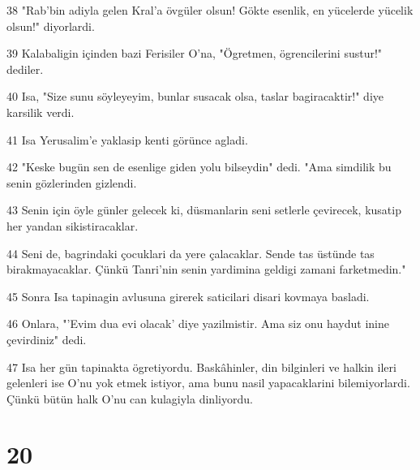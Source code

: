 \par 38 "Rab'bin adiyla gelen Kral'a övgüler olsun! Gökte esenlik, en yücelerde yücelik olsun!" diyorlardi.
\par 39 Kalabaligin içinden bazi Ferisiler O'na, "Ögretmen, ögrencilerini sustur!" dediler.
\par 40 Isa, "Size sunu söyleyeyim, bunlar susacak olsa, taslar bagiracaktir!" diye karsilik verdi.
\par 41 Isa Yerusalim'e yaklasip kenti görünce agladi.
\par 42 "Keske bugün sen de esenlige giden yolu bilseydin" dedi. "Ama simdilik bu senin gözlerinden gizlendi.
\par 43 Senin için öyle günler gelecek ki, düsmanlarin seni setlerle çevirecek, kusatip her yandan sikistiracaklar.
\par 44 Seni de, bagrindaki çocuklari da yere çalacaklar. Sende tas üstünde tas birakmayacaklar. Çünkü Tanri'nin senin yardimina geldigi zamani farketmedin."
\par 45 Sonra Isa tapinagin avlusuna girerek saticilari disari kovmaya basladi.
\par 46 Onlara, "'Evim dua evi olacak' diye yazilmistir. Ama siz onu haydut inine çevirdiniz" dedi.
\par 47 Isa her gün tapinakta ögretiyordu. Baskâhinler, din bilginleri ve halkin ileri gelenleri ise O'nu yok etmek istiyor, ama bunu nasil yapacaklarini bilemiyorlardi. Çünkü bütün halk O'nu can kulagiyla dinliyordu.

\chapter{20}

